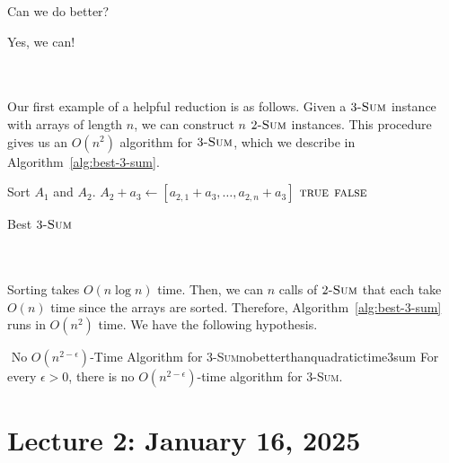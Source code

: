         \pagebreak
        \begin{question*}
            Can we do better?
        \end{question*}
        \begin{answer*}
            Yes, we can!
        \end{answer*} 
        \vphantom
        \\
        \\
        Our first example of a helpful reduction is as follows. Given a \(3\textsc{-Sum}\) instance with arrays of length \(n\), we can construct \(n\) \(2\textsc{-Sum}\) instances. This procedure gives us an \(O(n^2)\) algorithm for \(3\textsc{-Sum}\), which we describe in Algorithm~\ref{alg:best-3-sum}.
        \begin{algorithm}[H] 
            \begin{algorithmic}[1]
                    \State Sort \(A_1\) and \(A_2\).
                        \State \(A_2+a_3\gets [a_{2,1}+a_3,\ldots,a_{2,n}+a_3]\) 
                         \Return \(\textsc{true}\)
                        \EndIf
                    \EndFor
                    \State \Return \(\textsc{false}\)
                \EndProcedure 
            \end{algorithmic}
            \caption{Best \(3\textsc{-Sum}\)}
            \label{alg:best-3-sum}
        \end{algorithm}
        \vphantom
        \\
        \\
        Sorting takes \(O(n\log n)\) time. Then, we can \(n\) calls of \(2\textsc{-Sum}\) that each take \(O(n)\) time since the arrays are sorted. Therefore, Algorithm~\ref{alg:best-3-sum} runs in \(O(n^2)\) time. We have the following hypothesis.
        \begin{hypothesis}{\Stop\,\,No \(O(n^{2-\epsilon})\)-Time Algorithm for \(3\)-\textsc{Sum}}{nobetterthanquadratictime3sum}
            For every \(\epsilon>0\), there is no \(O\left(n^{2-\epsilon}\right)\)-time algorithm for \(3\)-\textsc{Sum}.
        \end{hypothesis}
        

\pagebreak

\section{Lecture 2: January 16, 2025}


